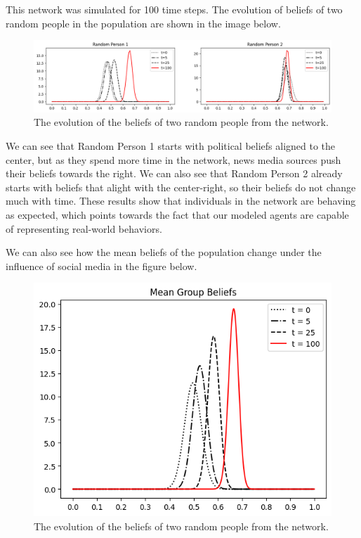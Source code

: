 \documentclass[11pt]{article}
\begin{document}
This network was simulated for 100 time steps. The evolution of beliefs of two random people in the population are shown in the image below.

\begin{figure}[h]
    \centering
    \includegraphics[scale=0.5]{images/Random people from news media simulation.png}
    \caption{The evolution of the beliefs of two random people from the network.}
\end{figure}

We can see that Random Person 1 starts with political beliefs aligned to the center, but as they spend more time in the network, news media sources push their beliefs towards the right. We can also see that Random Person 2 already starts with beliefs that alight with the center-right, so their beliefs do not change much with time. These results show that individuals in the network are behaving as expected, which points towards the fact that our modeled agents are capable of representing real-world behaviors.

We can also see how the mean beliefs of the population change under the influence of social media in the figure below.

\begin{figure}[h]
    \centering
    \includegraphics[scale=0.6]{images/Mean group beliefs from news media simulation.png}
    \caption{The evolution of the beliefs of two random people from the network.}
\end{figure}
\end{document}
